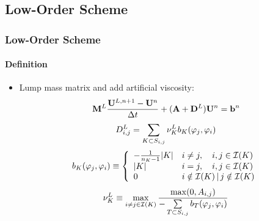 \documentclass{beamer}
\begin{document}
\subsection{Low-Order Scheme}
\begin{frame}
\frametitle{Low-Order Scheme}
\framesubtitle{Definition}

\begin{itemize}
   \item Lump mass matrix and add artificial viscosity:
   \begin{equation}\label{eq:loworderscheme}
      \mathbf{M}^L\frac{\mathbf{U}^{L,n+1}-\mathbf{U}^n}{\Delta t} + (\mathbf{A} + \mathbf{D}^L)\mathbf{U}^n = \mathbf{b}^n
   \end{equation}
   \begin{equation}\label{eq:loworderD}
      D_{i,j}^L = \sum\limits_{K\subset S_{i,j}}\nu_K^L b_K(\varphi_j,\varphi_i)
   \end{equation}
   \begin{equation}\label{eq:bilinearform}
      b_K(\varphi_j, \varphi_i) \equiv \left\{\begin{array}{l l}
         -\frac{1}{n_K - 1}|K| & i\ne j, \quad i,j\in \mathcal{I}(K)\\
         |K|                   & i = j,  \quad i,j\in \mathcal{I}(K)\\
         0                     & i\notin\mathcal{I}(K)\,|\, j\notin\mathcal{I}(K)
      \end{array}\right.
   \end{equation}
   \begin{equation}
      \nu_K^L \equiv \max\limits_{i\ne j\in \mathcal{I}(K)}\frac{\max(0,A_{i,j})}
      {-\sum\limits_{T\subset S_{i,j}} b_T(\varphi_j, \varphi_i)}
   \end{equation}
\end{itemize}

\end{frame}
\end{document}
